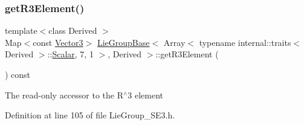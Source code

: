 \subsubsection{\texorpdfstring{get\+R3\+Element()}{getR3Element()}\hspace{0.1cm}{\footnotesize\ttfamily [2/2]}}
{\footnotesize\ttfamily template$<$class Derived $>$ \\
Map$<$const \hyperlink{class_lie_group_base_3_01_array_3_01typename_01internal_1_1traits_3_01_derived_01_4_1_1_scalar_0d6d4b5459662fc32c7117aee50362fb1_acf35a22e3543ed4824de3c19c965961c}{Vector3}$>$ \hyperlink{class_lie_group_base}{Lie\+Group\+Base}$<$ Array$<$ typename internal\+::traits$<$ Derived $>$\+::\hyperlink{class_lie_group_base_3_01_array_3_01typename_01internal_1_1traits_3_01_derived_01_4_1_1_scalar_0d6d4b5459662fc32c7117aee50362fb1_a831695c575380c9a1df32eff9fc4a8c6}{Scalar}, 7, 1 $>$, Derived $>$\+::get\+R3\+Element (\begin{DoxyParamCaption}{ }\end{DoxyParamCaption}) const\hspace{0.3cm}{\ttfamily [inline]}}

The read-\/only accessor to the R$^\wedge$3 element 

Definition at line 105 of file Lie\+Group\+\_\+\+S\+E3.\+h.

\hypertarget{class_lie_group_base_3_01_array_3_01typename_01internal_1_1traits_3_01_derived_01_4_1_1_scalar_0d6d4b5459662fc32c7117aee50362fb1_a2517b91d8ec4da8c307fa428d839000b}{}\label{class_lie_group_base_3_01_array_3_01typename_01internal_1_1traits_3_01_derived_01_4_1_1_scalar_0d6d4b5459662fc32c7117aee50362fb1_a2517b91d8ec4da8c307fa428d839000b} 
